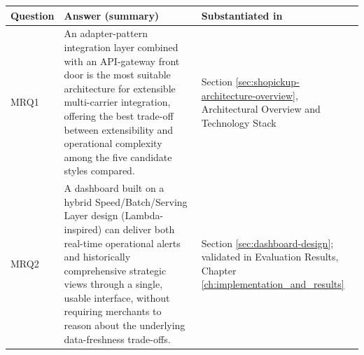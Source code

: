 \documentclass{imc-inf}
\begin{document}
\begin{table}[!htbp]
  \centering
  \small
  \begin{tabular}{@{}>{\raggedright\arraybackslash}p{1.3cm}p{9cm}p{3.4cm}@{}}
    \toprule
    \textbf{Question}                                                                                                                                                                                                                                                                                                              & \textbf{Answer (summary)} & \textbf{Substantiated in} \\
    \midrule
    MRQ1                                                                                                                                                                                                                                                                                                                           &
    An adapter-pattern integration layer combined with an API-gateway front door is the most suitable architecture for extensible multi-carrier integration, offering the best trade-off between extensibility and operational complexity among the five candidate styles compared.                                                &
    Section \ref{sec:shopickup-architecture-overview}, Architectural Overview and Technology Stack                                                                                                                                                                                                                                                                                         \\[10pt]

    MRQ2                                                                                                                                                                                                                                                                                                                           &
    A dashboard built on a hybrid Speed/Batch/Serving Layer design (Lambda-inspired) can deliver both real-time operational alerts and historically comprehensive strategic views through a single, usable interface, without requiring merchants to reason about the underlying data-freshness trade-offs.                        &
    Section \ref{sec:dashboard-design}; validated in Evaluation Results, Chapter \ref{ch:implementation_and_results}                                                                                                                                                                                                                                                                       \\[10pt]


\end{tabular}
\end{table}
\end{document}
